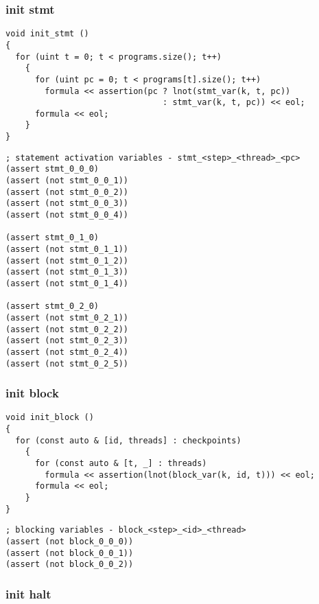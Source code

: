 \subsubsection{init stmt}

\begin{lstlisting}[style=c++]
void init_stmt ()
{
  for (uint t = 0; t < programs.size(); t++)
    {
      for (uint pc = 0; t < programs[t].size(); t++)
        formula << assertion(pc ? lnot(stmt_var(k, t, pc))
                                : stmt_var(k, t, pc)) << eol;
      formula << eol;
    }
}
\end{lstlisting}

\begin{lstlisting}[language=SMTLib]
; statement activation variables - stmt_<step>_<thread>_<pc>
(assert stmt_0_0_0)
(assert (not stmt_0_0_1))
(assert (not stmt_0_0_2))
(assert (not stmt_0_0_3))
(assert (not stmt_0_0_4))

(assert stmt_0_1_0)
(assert (not stmt_0_1_1))
(assert (not stmt_0_1_2))
(assert (not stmt_0_1_3))
(assert (not stmt_0_1_4))

(assert stmt_0_2_0)
(assert (not stmt_0_2_1))
(assert (not stmt_0_2_2))
(assert (not stmt_0_2_3))
(assert (not stmt_0_2_4))
(assert (not stmt_0_2_5))
\end{lstlisting}

\subsubsection{init block}

\begin{lstlisting}[style=c++]
void init_block ()
{
  for (const auto & [id, threads] : checkpoints)
    {
      for (const auto & [t, _] : threads)
        formula << assertion(lnot(block_var(k, id, t))) << eol;
      formula << eol;
    }
}
\end{lstlisting}

\begin{lstlisting}[language=SMTLib]
; blocking variables - block_<step>_<id>_<thread>
(assert (not block_0_0_0))
(assert (not block_0_0_1))
(assert (not block_0_0_2))
\end{lstlisting}

\subsubsection{init halt}

